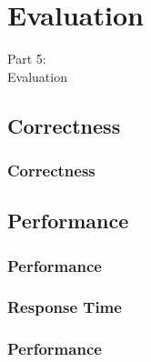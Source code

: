 \section{Evaluation}
\begin{frame}
  \vspace{25mm}
  \begin{center}
    \Huge{Part 5:\\Evaluation}
  \end{center}
\end{frame}

\subsection{Correctness}
\begin{frame}[fragile]
  \frametitle{Correctness}
  \vspace{3mm}
  
\end{frame}

\subsection{Performance}
\begin{frame}[fragile]
  \frametitle{Performance}
  \vspace{3mm}
  
\end{frame}

\subsubsection{Response Time}
\begin{frame}[fragile]
  \frametitle{Performance }
  \vspace{3mm}
  
\end{frame}

